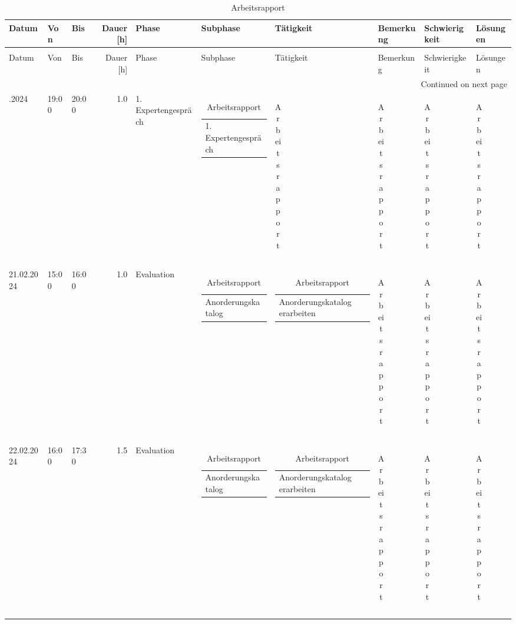 {\tiny
\begin{longtable}[H]{lllrllllll}

\toprule
Datum & Von & Bis & Dauer [h] & Phase & Subphase & Tätigkeit & Bemerkung & Schwierigkeit & Lösungen \\
\midrule
\endfirsthead
\caption[]{Arbeitsrapport} \\
\toprule
Datum & Von & Bis & Dauer [h] & Phase & Subphase & Tätigkeit & Bemerkung & Schwierigkeit & Lösungen \\
\midrule
\endhead
\midrule
\multicolumn{10}{r}{Continued on next page} \\
\midrule
\endfoot
\bottomrule
\endlastfoot
14.02.2024 & 19:00 & 20:00 & 1.0 & 1. Expertengespräch & \begin{tabular}[c]{@{}l@{}}1. Expertengespräch\end{tabular} & \begin{tabular}[c]{@{}l@{}}\end{tabular} & \begin{tabular}[c]{@{}l@{}}\end{tabular} & \begin{tabular}[c]{@{}l@{}}\end{tabular} & \begin{tabular}[c]{@{}l@{}}\end{tabular} \\
21.02.2024 & 15:00 & 16:00 & 1.0 & Evaluation & \begin{tabular}[c]{@{}l@{}}Anorderungskatalog\end{tabular} & \begin{tabular}[c]{@{}l@{}}Anorderungskatalog erarbeiten\end{tabular} & \begin{tabular}[c]{@{}l@{}}\end{tabular} & \begin{tabular}[c]{@{}l@{}}\end{tabular} & \begin{tabular}[c]{@{}l@{}}\end{tabular} \\
22.02.2024 & 16:00 & 17:30 & 1.5 & Evaluation & \begin{tabular}[c]{@{}l@{}}Anorderungskatalog\end{tabular} & \begin{tabular}[c]{@{}l@{}}Anorderungskatalog erarbeiten\end{tabular} & \begin{tabular}[c]{@{}l@{}}\end{tabular} & \begin{tabular}[c]{@{}l@{}}\end{tabular} & \begin{tabular}[c]{@{}l@{}}\end{tabular} \\

\end{longtable}}
